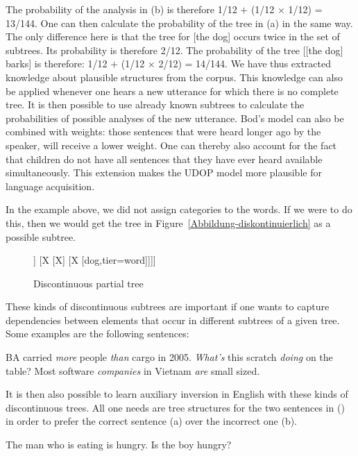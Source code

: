 The probability of the analysis in (b) is therefore 1/12 $+$ (1/12 $\times$ 1/12) = 13/144.
One can then calculate the probability of the tree in (a) in the same way. The only difference here is that the tree for
[the dog] occurs twice in the set of subtrees. Its probability is therefore
 2/12. The probability of the tree [[the dog] barks] is therefore:
 1/12 $+$ (1/12 $\times$ 2/12) = 14/144. We have thus extracted knowledge about plausible structures from the corpus. This knowledge can
also  be applied whenever one hears a new utterance for which there is no complete tree. It is then possible to use already known
 subtrees to calculate the probabilities of possible analyses of the new utterance.
Bod's model can also be combined with weights: those sentences that were heard longer ago by the speaker, will receive a lower weight.
One can thereby also account for the fact that children do not  have all sentences that they have ever heard available simultaneously. 
This extension makes the UDOP model more plausible for language acquisition.

In the example above, we did not assign categories to the words. If we were to do this, then we
would get the tree in Figure~\vref{Abbildung-diskontinuierlich} as a possible
subtree.
\begin{figure}
\centering
\begin{forest}
[X
	[X
		[watch,tier=word]]
	[X
		[X]
		[X
			[dog,tier=word]]]]
\end{forest}
\caption{\label{Abbildung-diskontinuierlich}Discontinuous partial tree}
\end{figure}%
These kinds of discontinuous subtrees are important if one wants to capture dependencies between elements that occur in different subtrees
of a given tree. Some examples are the following sentences:

\eal
\ex BA carried \emph{more} people \emph{than} cargo in 2005.
\ex \emph{What's} this scratch \emph{doing} on the table?
\ex Most software \emph{companies} in Vietnam \emph{are} small sized.
\zl

\noindent
It is then also possible to learn auxiliary inversion in English with these kinds of discontinuous
trees. All one needs are tree structures for the two sentences in () in order to prefer the correct sentence (a) over the incorrect one (b).

\eal
\label{Beispiel-Inversion}
\ex The man who is eating is hungry.
\ex Is the boy hungry?
\zl

